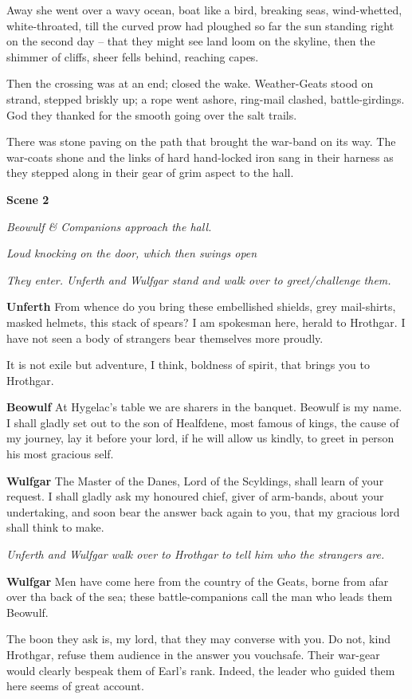\documentclass[a4paper]{article}
\begin{document}
{Away she went over a wavy ocean,
boat like a bird, breaking seas,
wind-whetted, white-throated,
till the curved prow had ploughed so far
the sun standing right on the second day –
that they might see land loom on the skyline,
then the shimmer of cliffs, sheer fells behind,
reaching capes.

Then the crossing was at an end;
closed the wake. Weather-Geats
stood on strand, stepped briskly up;
a rope went ashore, ring-mail clashed,
battle-girdings. God they thanked
for the smooth going over the salt trails.

There was stone paving on the path that brought
the war-band on its way. The war-coats shone
and the links of hard hand-locked iron
sang in their harness as they stepped along
in their gear of grim aspect to the hall.

\centerline{\textbf{Scene 2}}
\centerline{\textit{Beowulf \& Companions approach the hall.}}
\centerline{\textit{Loud knocking on the door, which then swings open}}
\centerline{\textit{They enter. Unferth and Wulfgar stand and walk over to greet/challenge them.}}

\textbf{Unferth} From whence do you bring these embellished shields, 
grey mail-shirts, masked helmets, 
this stack of spears? I am spokesman here,
herald to Hrothgar. I have not seen
a body of strangers bear themselves more proudly.

It is not exile but adventure, I think,
boldness of spirit, that brings you to Hrothgar.

\textbf{Beowulf} At Hygelac's table we are sharers in the banquet.
Beowulf is my name.
I shall gladly set out to the son of Healfdene,
most famous of kings, the cause of my journey,
lay it before your lord, if he will allow us kindly,
to greet in person his most gracious self.

\textbf{Wulfgar} The Master of the Danes,
Lord of the Scyldings, shall learn of your request.
I shall gladly ask my honoured chief,
giver of arm-bands, about your undertaking,
and soon bear the answer back again to you,
that my gracious lord shall think to make.

\centerline{\textit{Unferth and Wulfgar walk over to Hrothgar to tell him who the strangers are.}}

\textbf{Wulfgar} Men have come here from the country of the Geats,
borne from afar over tha back of the sea;
these battle-companions call the man who leads them Beowulf.

The boon they ask is, my lord, that they may converse with you. 
Do not, kind Hrothgar, refuse them audience in the answer you vouchsafe.
Their war-gear would clearly bespeak them of Earl's rank. 
Indeed, the leader who guided them here seems of great account.

}
\end{document}

